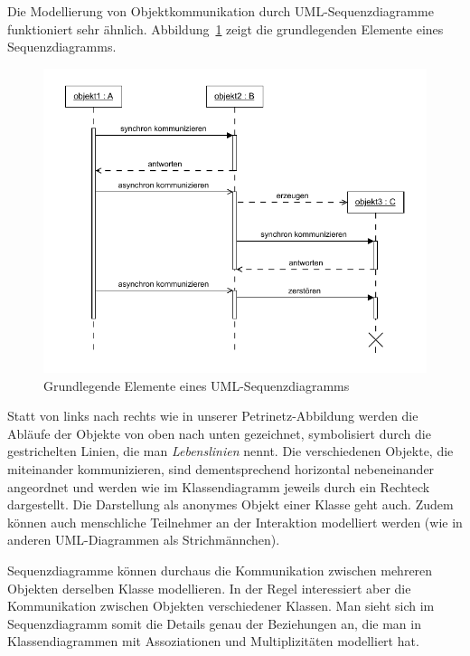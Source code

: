 \pagebreak %

Die Modellierung von Objektkommunikation durch UML-Sequenzdiagramme funktioniert sehr ähnlich. Abbildung~\ref{fig:uml_sequenzdiagramm} zeigt die grundlegenden Elemente eines 
\linebreak %
Sequenzdiagramms. 


\begin{figure}[!htbp]
	\centering
	\includegraphics[scale=1.0]{Bilder/Kapitel-5/uml_sequenzdiagramm.pdf}
	\caption{Grundlegende Elemente eines UML-Sequenzdiagramms}
	\label{fig:uml_sequenzdiagramm}
\end{figure}


Statt von links nach rechts wie in unserer Petrinetz-Abbildung werden die Abläufe der Objekte von oben nach unten gezeichnet, symbolisiert durch die gestrichelten Linien, die man \textit{Lebenslinien} 
nennt. Die verschiedenen Objekte, die miteinander kommunizieren, sind dementsprechend horizontal nebeneinander angeordnet und werden wie im Klassendiagramm jeweils durch ein Rechteck dargestellt. Die Darstellung als anonymes Objekt einer Klasse geht auch. Zudem können auch menschliche Teilnehmer an der Interaktion modelliert werden (wie in anderen UML-Diagrammen als Strichmännchen). 

Sequenzdiagramme können durchaus die Kommunikation zwischen mehreren Objekten derselben Klasse modellieren. In der Regel interessiert aber die Kommunikation zwischen Objekten verschiedener Klassen. Man sieht sich im Sequenzdiagramm somit die Details genau der Beziehungen an, die man in Klassendiagrammen mit Assoziationen und Multiplizitäten modelliert hat.

